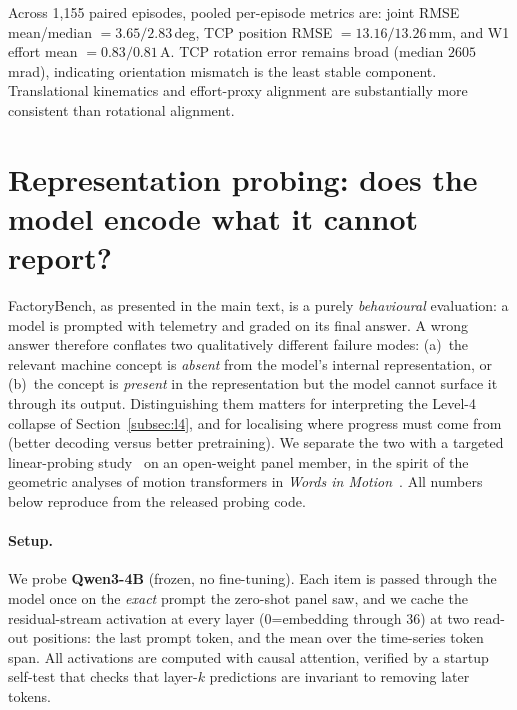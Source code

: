 Across 1{,}155 paired episodes, pooled per-episode metrics are: joint RMSE mean/median $=3.65/2.83$\,deg, TCP position RMSE $=13.16/13.26$\,mm, and W1 effort mean $=0.83/0.81$\,A. TCP rotation error remains broad (median $2605$\,mrad), indicating orientation mismatch is the least stable component. Translational kinematics and effort-proxy alignment are substantially more consistent than rotational alignment.


\section{Representation probing: does the model encode what it cannot report?}
\label{app:probing}

FactoryBench, as presented in the main text, is a purely \emph{behavioural} evaluation: a model is prompted with telemetry and graded on its final answer. A wrong answer therefore conflates two qualitatively different failure modes: (a)~the relevant machine concept is \emph{absent} from the model's internal representation, or (b)~the concept is \emph{present} in the representation but the model cannot surface it through its output. Distinguishing them matters for interpreting the Level-4 collapse of Section~\ref{subsec:l4}, and for localising where progress must come from (better decoding versus better pretraining). We separate the two with a targeted linear-probing study~\cite{alain2016probes} on an open-weight panel member, in the spirit of the geometric analyses of motion transformers in \emph{Words in Motion}~\cite{tas2025words}. All numbers below reproduce from the released probing code.

\paragraph{Setup.} We probe \textbf{Qwen3-4B} (frozen, no fine-tuning). Each item is passed through the model once on the \emph{exact} prompt the zero-shot panel saw, and we cache the residual-stream activation at every layer ($0$=embedding through $36$) at two read-out positions: the last prompt token, and the mean over the time-series token span. All activations are computed with causal attention, verified by a startup self-test that checks that layer-$k$ predictions are invariant to removing later tokens.

